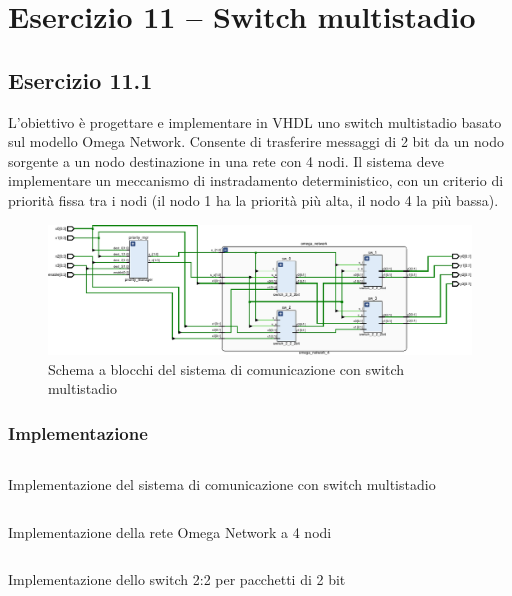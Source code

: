\section{Esercizio 11 -- Switch multistadio}
\subsection{Esercizio 11.1}
L'obiettivo è progettare e implementare in VHDL uno switch multistadio basato sul modello Omega Network. Consente di trasferire messaggi di 2 bit da un nodo sorgente a un nodo destinazione in una rete con 4 nodi. Il sistema deve implementare un meccanismo di instradamento deterministico, con un criterio di priorità fissa tra i nodi (il nodo 1 ha la priorità più alta, il nodo 4 la più bassa).

\begin{figure}[h]
    \centering
    \includegraphics[width=\textwidth]{img/11_OMEGA_NETWORK.pdf}
    \caption{Schema a blocchi del sistema di comunicazione con switch multistadio}
    \label{fig:11_OMEGA_NETWORK}
\end{figure}

\subsubsection{Implementazione}

\begin{code}
    \inputminted{vhdl}{vhdl/omega_network_system.vhd}
    \caption{Implementazione del sistema di comunicazione con switch multistadio}
    \label{cod:omega_network_system}
\end{code}

\begin{code}
    \inputminted{vhdl}{vhdl/omega_network_4.vhd}
    \caption{Implementazione della rete Omega Network a 4 nodi}
    \label{cod:omega_network_4}
\end{code}

\begin{code}
    \inputminted{vhdl}{vhdl/switch_2_2_2bit.vhd}
    \caption{Implementazione dello switch 2:2 per pacchetti di 2 bit}
    \label{cod:switch_2_2_2bit}
\end{code}

